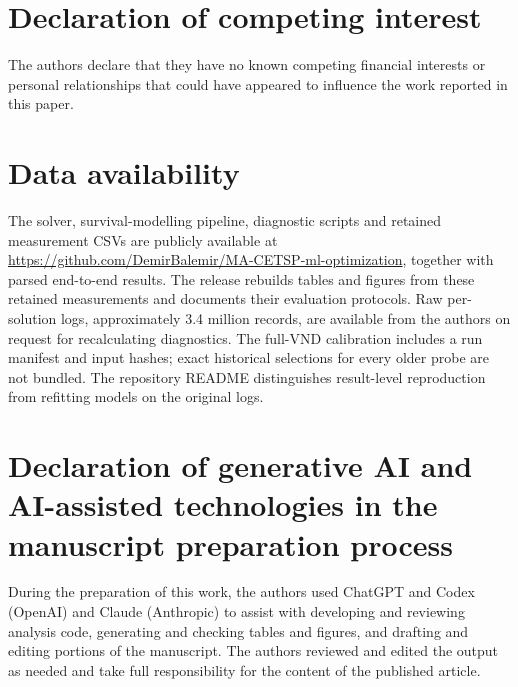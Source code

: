 \documentclass[a4paper,fleqn]{cas-dc}
\begin{document}
\section*{Declaration of competing interest}
The authors declare that they have no known competing financial interests or
personal relationships that could have appeared to influence the work reported
in this paper.

\section*{Data availability}
The solver, survival-modelling pipeline, diagnostic scripts and retained
measurement CSVs are publicly available at
\url{https://github.com/DemirBalemir/MA-CETSP-ml-optimization}, together with
parsed end-to-end results. The release rebuilds tables and figures from these
retained measurements and documents their evaluation protocols. Raw per-solution
logs, approximately 3.4 million records, are available from the authors on request
for recalculating diagnostics. The full-VND calibration includes a run manifest
and input hashes; exact historical selections for every older probe are not
bundled. The repository README distinguishes result-level reproduction from
refitting models on the original logs.

\section*{Declaration of generative AI and AI-assisted technologies in the
manuscript preparation process}
During the preparation of this work, the authors used ChatGPT and Codex (OpenAI)
and Claude (Anthropic) to assist with developing and reviewing analysis code,
generating and checking tables and figures, and drafting and editing portions of
the manuscript. The authors reviewed and edited the output as needed and take
full responsibility for the content of the published article.

\printbibliography
\end{document}
